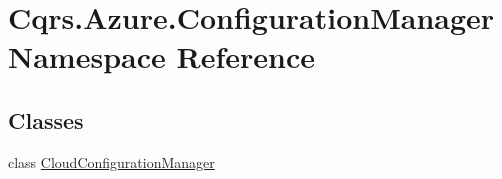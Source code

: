 \hypertarget{namespaceCqrs_1_1Azure_1_1ConfigurationManager}{}\section{Cqrs.\+Azure.\+Configuration\+Manager Namespace Reference}
\label{namespaceCqrs_1_1Azure_1_1ConfigurationManager}
\subsection*{Classes}
\begin{DoxyCompactItemize}
\item 
class \hyperlink{classCqrs_1_1Azure_1_1ConfigurationManager_1_1CloudConfigurationManager}{Cloud\+Configuration\+Manager}
\end{DoxyCompactItemize}
